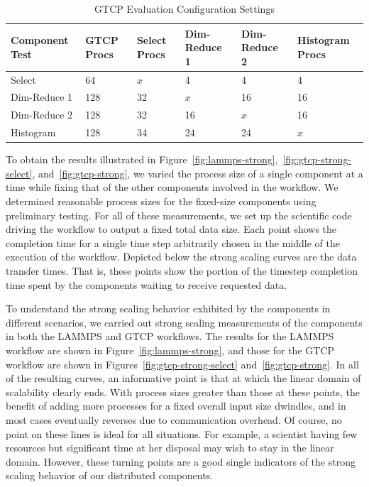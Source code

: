 \documentclass[conference]{IEEEtran}
\begin{document}

\begin{table}[tbp]
\centering
\caption{GTCP Evaluation Configuration Settings}
\label{tab:eval-strong-gtcp}
\begin{tabular}{|l|l|l|l|l|l|}
\hline
Component Test & GTCP Procs & Select Procs & Dim-Reduce 1 & Dim-Reduce 2 & Histogram Procs \\
\hline
Select & 64 & $x$ & 4 & 4 & 4\\
\hline
Dim-Reduce 1 & 128 & 32 & $x$ & 16 & 16\\
\hline
Dim-Reduce 2 & 128 & 32 & 16 & $x$ & 16\\
\hline
Histogram & 128 & 34 & 24 & 24 & $x$\\
\hline
\end{tabular}
\end{table}


To obtain the results illustrated in
Figure~\ref{fig:lammps-strong},~\ref{fig:gtcp-strong-select},
and~\ref{fig:gtcp-strong}, we varied the process size of a single component at
a time while fixing that of the other components involved in the workflow.  We
determined reasonable process sizes for the fixed-size components using
preliminary testing. For all of these measurements, we set up the scientific
code driving the workflow to output a fixed total data size. Each point shows
the completion time for a single time step arbitrarily chosen in the middle of
the execution of the workflow. Depicted below the strong scaling curves are the
data transfer times. That is, these points show the portion of the timestep
completion time spent by the components waiting to receive requested data.

To understand the strong scaling behavior exhibited by the components in
different scenarios, we carried out strong scaling measurements of the
components in both the LAMMPS and GTCP workflows. The results for the LAMMPS
workflow are shown in Figure~\ref{fig:lammps-strong}, and those for the GTCP
workflow are shown in Figures~\ref{fig:gtcp-strong-select}
and~\ref{fig:gtcp-strong}. In all of the resulting curves, an informative point
is that at which the linear domain of scalability clearly ends. With process
sizes greater than those at these points, the benefit of adding more processes
for a fixed overall input size dwindles, and in most cases eventually reverses
due to communication overhead. Of course, no point on these lines is ideal for
all situations. For example, a scientist having few resources but significant
time at her disposal may wish to stay in the linear domain. However, these
turning points are a good single indicators of the strong scaling behavior of
our distributed components.
\end{document}

